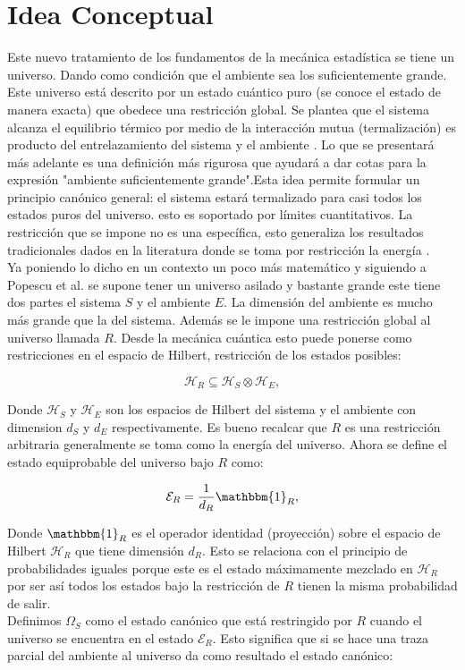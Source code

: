 \section{Idea Conceptual}

Este nuevo tratamiento de los fundamentos de la mecánica estadística se tiene un universo. Dando como condición que el ambiente sea los suficientemente grande. Este universo está descrito por un estado cuántico puro (se conoce el estado de manera exacta) que obedece una restricción global. Se plantea que el sistema alcanza el equilibrio térmico por medio de la interacción mutua (termalización) es producto del entrelazamiento del sistema y el ambiente  \cite{Popescu2006}. Lo que se presentará más adelante es una definición más rigurosa que ayudará a dar cotas para la expresión "ambiente suficientemente grande".Esta idea permite formular un principio canónico general: el sistema estará termalizado para casi todos los estados puros del universo. esto es soportado por límites cuantitativos. La restricción que se impone no es una específica, esto generaliza los resultados tradicionales dados en la literatura donde se toma por restricción la energía \cite{KardarStat}.
\\
Ya poniendo lo dicho en un contexto un poco más matemático y siguiendo a Popescu et al. se supone tener un universo asilado y bastante grande este tiene dos partes el sistema $S$ y el ambiente $E$. La dimensión del ambiente es mucho más grande que la del sistema. Además se le impone una restricción global al universo llamada $R$. Desde la mecánica cuántica esto puede ponerse como restricciones en el espacio de Hilbert, restricción de los estados posibles:

\begin{equation}
\mathcal{H}_{R}\subseteq \mathcal{H}_{S}\otimes \mathcal{H}_{E},
\end{equation}

Donde $\mathcal{H}_{S}$ y $\mathcal{H}_{E}$ son los espacios de Hilbert del sistema y el ambiente con dimension $d_{S}$  y $d_{E}$ respectivamente. Es bueno recalcar que $R$ es una restricción arbitraria generalmente se toma como la energía del universo. Ahora se define el estado equiprobable del universo bajo $R$ como:

\begin{equation}
\mathcal{E}_{R} = \frac{1}{d_{R}} \mathbbm{1}_{R},
\end{equation}

Donde $\mathbbm{1}_{R}$ es el operador identidad (proyección) sobre el espacio de Hilbert  $\mathcal{H}_{R}$  que tiene dimensión $d_{R}$. Esto se relaciona con el principio de probabilidades iguales porque este es el estado máximamente mezclado en $\mathcal{H}_{R}$  \cite{SakuraiQuantum} por ser así todos los estados bajo la restricción de $R$ tienen la misma probabilidad de salir.
\\
Definimos $\Omega_{S}$ como el estado canónico que está restringido por $R$ cuando el universo se encuentra en el estado $\mathcal{E}_{R}$. Esto significa que si se hace una traza parcial del ambiente al universo da como resultado el estado canónico:

